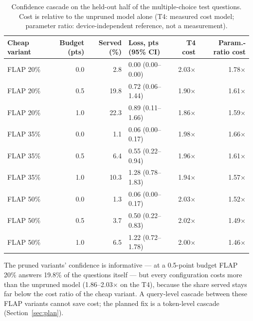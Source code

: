 \begin{table}[!htbp]\centering\small
\begin{tabular}{lrrlrr}
\toprule
Cheap variant & Budget (pts) & Served (\%) & Loss, pts (95\% CI) & T4 cost & Param.-ratio cost \\
\midrule
FLAP 20\% & 0.0 & 2.8 & 0.00 (0.00--0.00) & 2.03$\times$ & 1.78$\times$ \\
FLAP 20\% & 0.5 & 19.8 & 0.72 (0.06--1.44) & 1.90$\times$ & 1.61$\times$ \\
FLAP 20\% & 1.0 & 22.3 & 0.89 (0.11--1.66) & 1.86$\times$ & 1.59$\times$ \\
FLAP 35\% & 0.0 & 1.1 & 0.06 (0.00--0.17) & 1.98$\times$ & 1.66$\times$ \\
FLAP 35\% & 0.5 & 6.4 & 0.55 (0.22--0.94) & 1.96$\times$ & 1.61$\times$ \\
FLAP 35\% & 1.0 & 10.3 & 1.28 (0.78--1.83) & 1.94$\times$ & 1.57$\times$ \\
FLAP 50\% & 0.0 & 1.3 & 0.06 (0.00--0.17) & 2.03$\times$ & 1.52$\times$ \\
FLAP 50\% & 0.5 & 3.7 & 0.50 (0.22--0.83) & 2.02$\times$ & 1.49$\times$ \\
FLAP 50\% & 1.0 & 6.5 & 1.22 (0.72--1.78) & 2.00$\times$ & 1.46$\times$ \\
\bottomrule
\end{tabular}
\caption{Confidence cascade on the held-out half of the multiple-choice test questions. Cost is relative to the unpruned model alone (T4: measured cost model; parameter ratio: device-independent reference, not a measurement).}\label{tab:cascade}
\end{table}

The pruned variants' confidence is informative --- at a 0.5-point budget FLAP 20\% answers 19.8\% of the questions itself --- but every configuration costs more than the unpruned model (1.86--2.03$\times$ on the T4), because the share served stays far below the cost ratio of the cheap variant. A query-level cascade between these FLAP variants cannot save cost; the planned fix is a token-level cascade (Section~\ref{sec:plan}).

